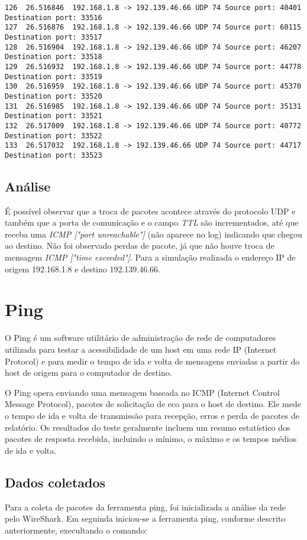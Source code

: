 \documentclass[a4paper]{report} %
\begin{document}
\begin{lstlisting}
126  26.516846  192.168.1.8 -> 192.139.46.66 UDP 74 Source port: 40401  Destination port: 33516
127  26.516876  192.168.1.8 -> 192.139.46.66 UDP 74 Source port: 60115  Destination port: 33517
128  26.516904  192.168.1.8 -> 192.139.46.66 UDP 74 Source port: 46207  Destination port: 33518
129  26.516932  192.168.1.8 -> 192.139.46.66 UDP 74 Source port: 44778  Destination port: 33519
130  26.516959  192.168.1.8 -> 192.139.46.66 UDP 74 Source port: 45370  Destination port: 33520
131  26.516985  192.168.1.8 -> 192.139.46.66 UDP 74 Source port: 35131  Destination port: 33521
132  26.517009  192.168.1.8 -> 192.139.46.66 UDP 74 Source port: 40772  Destination port: 33522
133  26.517032  192.168.1.8 -> 192.139.46.66 UDP 74 Source port: 44717  Destination port: 33523

\end{lstlisting}

\subsection{Análise}
\label{sub_traceroute_analise}
É possível observar que a troca de pacotes acontece através do protocolo UDP e também que a porta de comunicação e o campo \textit{TTL} são incrementados, até que receba uma \textit{ICMP ["port unreachable"]} (não aparece no log) indicando que chegou ao destino.
Não foi observado perdas de pacote, já que não houve troca de mensagem \textit{ICMP ["time exceeded"]}. Para a simulação realizada o endereço IP de origem 192.168.1.8 e destino 192.139.46.66.


\section{Ping}
\label{sec_ping}
O Ping é um software utilitário de administração de rede de computadores utilizada para testar a acessibilidade de um host em uma rede IP (Internet Protocol) e para medir o tempo de ida e volta de mensagens enviadas a partir do host de origem para o computador de destino.

O Ping opera enviando uma mensagem baseada no ICMP (Internet Control Message Protocol), pacotes de solicitação de eco para o host de destino. Ele mede o tempo de ida e volta de transmissão para recepção, erros e perda de pacotes de relatório. Os resultados do teste geralmente incluem um resumo estatístico dos pacotes de resposta recebida, incluindo o mínimo, o máximo e os tempos médios de ida e volta.

\subsection{Dados coletados}
\label{sub_ping_dados}
Para a coleta de pacotes da ferramenta ping, foi inicializada a análise da rede pelo WireShark. Em seguinda iniciou-se a ferramenta ping, conforme descrito anteriormente, execultando o comando:
\end{document}
